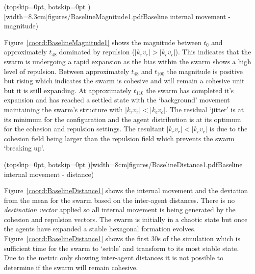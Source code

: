 \documentclass{ieeeaccess}
\begin{document}

\Figure[t!](topskip=0pt, botskip=0pt )[width=8.3cm]{figures/BaselineMagnitude1.pdf}{Baseline internal movement - magnitude)\label{coord:BaselineMagnitude1}}

Figure~\ref{coord:BaselineMagnitude1} shows the magnitude between $t_0$ and approximately $t_{48}$ dominated by repulsion ($|k_rv_r| > |k_cv_c|$). This indicates that the swarm is undergoing a rapid expansion as the bias within the swarm shows a high level of repulsion. Between approximately $t_{48}$ and $t_{100}$ the magnitude is positive but rising which indicates the swarm is cohesive and will remain a cohesive unit but it is still expanding. At approximately $t_{110}$ the swarm has completed it's expansion and has reached a settled state with the `background' movement maintaining the swarm's structure with $|k_rv_r| < |k_cv_c|$. The residual `jitter' is at its minimum for the configuration and the agent distribution is at its optimum for the cohesion and repulsion settings. The resultant $|k_rv_r| < |k_cv_c|$ is due to the cohesion field being larger than the repulsion field which prevents the swarm `breaking up'. 


\Figure[t!](topskip=0pt, botskip=0pt )[width=8cm]{figures/BaselineDistance1.pdf}{Baseline internal movement - distance)\label{coord:BaselineDistance1}}

Figure~\ref{coord:BaselineDistance1} shows the internal movement and the deviation from the mean for the swarm based on the inter-agent distances. There is no \textit{destination vector} applied so all internal movement is being generated by the cohesion and repulsion vectors. The swarm is initially in a chaotic state but once the agents have expanded a stable hexagonal formation evolves. Figure~\ref{coord:BaselineDistance1} shows the first 30s of the simulation which is sufficient time for the swarm to `settle' and transform to its most stable state. Due to the metric only showing inter-agent distances it is not possible to determine if the swarm will remain cohesive.
\end{document}
